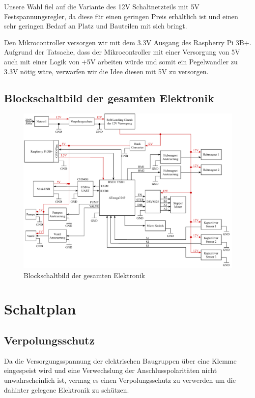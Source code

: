 Unsere Wahl fiel auf die Variante des 12V Schaltnetzteils mit 5V Festspannungsregler, da diese für einen geringen Preis erhältlich ist
und einen sehr geringen Bedarf an Platz und Bauteilen mit sich bringt.

Den Mikrocontroller versorgen wir mit dem 3.3V Ausgang des Raspberry Pi 3B+.
Aufgrund der Tatsache, dass der Mikrocontroller mit einer Versorgung von 5V auch mit einer Logik von +5V arbeiten würde und somit ein Pegelwandler zu 3.3V nötig wäre,
verwarfen wir die Idee diesen mit 5V zu versorgen.

\newpage

\subsection{Blockschaltbild der gesamten Elektronik}

\begin{figure}[hb]
\centering
\includegraphics[scale=0.85,page=1]{fig/elektro/ElectroBlockDiagram.pdf}
\caption{Blockschaltbild der gesamten Elektronik}
\end{figure}

\newpage


\section{Schaltplan}

\subsection{Verpolungsschutz}
Da die Versorgungsspannung der elektrischen Baugruppen über eine Klemme eingespeist wird und eine Verwechslung der Anschlusspolaritäten nicht unwahrscheinlich ist,
vermag es einen Verpolungsschutz zu verwerden um die dahinter gelegene Elektronik zu schützen.

